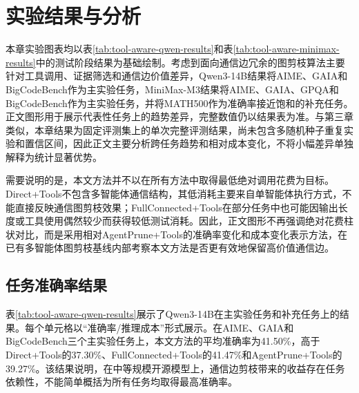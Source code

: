 \section{实验结果与分析}

本章实验图表均以表\ref{tab:tool-aware-qwen-results}和表\ref{tab:tool-aware-minimax-results}中的测试阶段结果为基础绘制。考虑到面向通信边冗余的图剪枝算法主要针对工具调用、证据筛选和通信边价值差异，Qwen3-14B结果将AIME、GAIA和BigCodeBench作为主实验任务，MiniMax-M3结果将AIME、GAIA、GPQA和BigCodeBench作为主实验任务，并将MATH500作为准确率接近饱和的补充任务。正文图形用于展示代表性任务上的趋势差异，完整数值仍以结果表为准。与第三章类似，本章结果为固定评测集上的单次完整评测结果，尚未包含多随机种子重复实验和置信区间，因此正文主要分析跨任务趋势和相对成本变化，不将小幅差异单独解释为统计显著优势。

需要说明的是，本文方法并不以在所有方法中取得最低绝对调用花费为目标。Direct+Tools不包含多智能体通信结构，其低消耗主要来自单智能体执行方式，不能直接反映通信图剪枝效果；FullConnected+Tools在部分任务中也可能因输出长度或工具使用偶然较少而获得较低测试消耗。因此，正文图形不再强调绝对花费柱状对比，而是采用相对AgentPrune+Tools的准确率变化和成本变化表示方法，在已有多智能体图剪枝基线内部考察本文方法是否更有效地保留高价值通信边。

\subsection{任务准确率结果}

表\ref{tab:tool-aware-qwen-results}展示了Qwen3-14B在主实验任务和补充任务上的结果。每个单元格以``准确率/推理成本''形式展示。在AIME、GAIA和BigCodeBench三个主实验任务上，本文方法的平均准确率为41.50\%，高于Direct+Tools的37.30\%、FullConnected+Tools的41.47\%和AgentPrune+Tools的39.27\%。该结果说明，在中等规模开源模型上，通信边剪枝带来的收益存在任务依赖性，不能简单概括为所有任务均取得最高准确率。

\begin{table}[H]
  \centering
  \caption{Qwen3-14B下面向通信边冗余的图剪枝结果}
  \label{tab:tool-aware-qwen-results}
\end{table}

